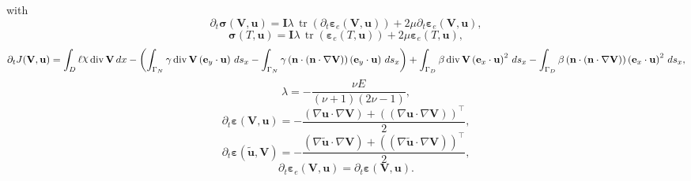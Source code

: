 \documentclass[preview]{standalone}
\let\oldcdot\cdot
\let\cdot\oldcdot
\begin{document}
with
\begin{dmath*}
\partial_{t} \pmb \sigma({\mathbf V},{\mathbf{ u }}) = \mathbf{I} \lambda  \,\operatorname{tr}\left(\partial_{t} \pmb\varepsilon_e({\mathbf V},{\mathbf{ u }})\right)  + 2 \mu \partial_{t} \pmb\varepsilon_e({\mathbf V},{\mathbf{ u }}),
 \end{dmath*}
\begin{dmath*}
\pmb \sigma(T,{\mathbf{ u }}) = \mathbf{I} \lambda  \,\operatorname{tr}\left(\pmb\varepsilon_{e}(T,{\mathbf{ u }})\right)  + 2 \mu \pmb\varepsilon_{e}(T,{\mathbf{ u }}),
 \end{dmath*}
\begin{dmath*}
\partial_{t} J({\mathbf V},{\mathbf{ u }}) =  \int_{D} \ell \raisebox{\depth}{$\chi$} \operatorname{div} {\mathbf V} \,dx - \left( \int_{\Gamma_N} \gamma \operatorname{div} {\mathbf V} \left( \mathbf e_y \cdot {\mathbf{ u }} \right) \,ds_x -  \int_{\Gamma_N} \gamma \left( \mathbf n \cdot \left( \mathbf n \cdot  \nabla {\mathbf V}  \right) \right) \left( \mathbf e_y \cdot {\mathbf{ u }} \right) \,ds_x\right) +  \int_{\Gamma_D} \beta \operatorname{div} {\mathbf V} \left( \mathbf e_x \cdot {\mathbf{ u }} \right)^{2} \,ds_x -  \int_{\Gamma_D} \beta \left( \mathbf n \cdot \left( \mathbf n \cdot  \nabla {\mathbf V}  \right) \right) \left( \mathbf e_x \cdot {\mathbf{ u }} \right)^{2} \,ds_x,
 \end{dmath*}
\begin{dmath*}
\lambda = - \frac{\nu E}{\left(\nu + 1\right) \left(2 \nu - 1\right)},
 \end{dmath*}
\begin{dmath*}
\partial_{t} \bm\varepsilon({\mathbf V},{\mathbf{ u }}) = - \frac{\left(  \nabla {\mathbf{ u }}  \cdot  \nabla {\mathbf V}  \right) +  \left( \left(  \nabla {\mathbf{ u }}  \cdot  \nabla {\mathbf V}  \right) \right)^\top }{2},
 \end{dmath*}
\begin{dmath*}
\partial_{t} \pmb\varepsilon(\tilde{\mathbf{ u }},{\mathbf V}) = - \frac{\left(  \nabla \tilde{\mathbf{ u }}  \cdot  \nabla {\mathbf V}  \right) +  \left( \left(  \nabla \tilde{\mathbf{ u }}  \cdot  \nabla {\mathbf V}  \right) \right)^\top }{2},
 \end{dmath*}
\begin{dmath*}
\partial_{t} \pmb\varepsilon_e({\mathbf V},{\mathbf{ u }}) = \partial_{t} \bm\varepsilon({\mathbf V},{\mathbf{ u }}).
 \end{dmath*}
\end{document}
